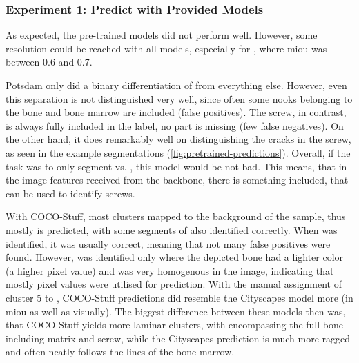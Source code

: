\subsubsection{Experiment 1: Predict with Provided Models}
As expected, the pre-trained models did not perform well.
However, some resolution could be reached with all models, especially for , where \gls{miou} was between 0.6 and 0.7.

Potsdam only did a binary differentiation of  from everything else.
However, even this separation is not distinguished very well, since often some nooks belonging to the bone and bone marrow are included (false positives).
The screw, in contrast, is always fully included in the label, no part is missing (few false negatives).
On the other hand, it does remarkably well on distinguishing the cracks in the screw, as seen in the example segmentations (\autoref{fig:pretrained-predictions}).
Overall, if the task was to only segment  vs. , this model would be not bad.
This means, that in the image features received from the backbone, there is something included, that can be used to identify screws.

With COCO-Stuff, most clusters mapped to the background of the sample, thus mostly  is predicted, with some segments of  also identified correctly.
When  was identified, it was usually correct, meaning that not many false positives were found.
However,  was identified only where the depicted bone had a lighter color (a higher pixel value) and was very homogenous in the image, indicating that mostly pixel values were utilised for prediction.
With the manual assignment of cluster 5 to , COCO-Stuff predictions did resemble the Cityscapes model more (in \gls{miou} as well as visually).
The biggest difference between these models then was, that COCO-Stuff yields more laminar clusters, with  encompassing the full bone including matrix and screw, while the Cityscapes prediction is much more ragged and often neatly follows the lines of the bone marrow.


